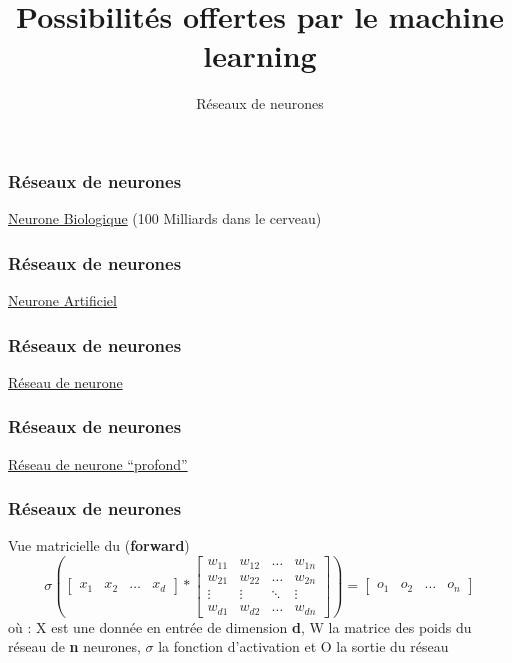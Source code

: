 \documentclass{formation}
\title{Possibilités offertes par le machine learning}
\subtitle{Réseaux de neurones}
\begin{document}
\maketitle

\begin{frame}
  \frametitle{Réseaux de neurones}
  \begin{center}
    \underline{Neurone Biologique} (100 Milliards dans le cerveau)
  \end{center}
\end{frame}

\begin{frame}
  \frametitle{Réseaux de neurones}
  \begin{center}
    \underline{Neurone Artificiel}
  \end{center}
\end{frame}

\begin{frame}
  \frametitle{Réseaux de neurones}
  \begin{center}
    \underline{Réseau de neurone}
  \end{center}
\end{frame}

\begin{frame}
  \frametitle{Réseaux de neurones}
  \begin{center}
    \underline{Réseau de neurone ``profond''}
  \end{center}
\end{frame}

\begin{frame}
  \frametitle{Réseaux de neurones}
  Vue matricielle du (\textbf{forward})
  \[
  \sigma \left(
  \begin{bmatrix}
    x_{1} & x_{2} & \dots & x_{d}
  \end{bmatrix}
  *
  \begin{bmatrix}
    w_{11} & w_{12} & \dots  & w_{1n} \\
    w_{21} & w_{22} & \dots  & w_{2n} \\
    \vdots & \vdots & \ddots & \vdots \\
    w_{d1} & w_{d2} & \dots  & w_{dn}
  \end{bmatrix}
  \right )
  =
  \begin{bmatrix}
    o_{1} & o_{2} & \dots & o_{n}
  \end{bmatrix}
  \]
  \newline
  où :
  \newline
  X est une donnée en entrée de dimension \textbf{d},
  \newline
  W la matrice des poids du réseau de  \textbf{n} neurones,
  \newline
  $\sigma$ la fonction d'activation et
  \newline
  O la sortie du réseau
\end{frame}
\end{document}
